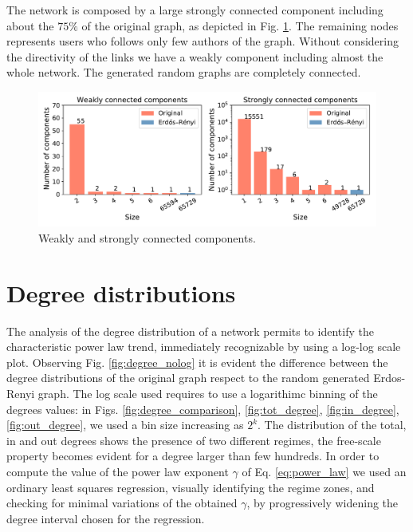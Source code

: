 \documentclass[11pt, twoside]{report}
\begin{document}
%  



The network is composed by a large strongly connected component including about the $75\%$ of the original graph, as depicted in Fig. \ref{fig:components}. The remaining nodes represents users who follows only few authors of the graph. Without considering the directivity of the links
we have a weakly component including almost the whole network. The generated random graphs are completely connected.


    \begin{figure}[H]
      \centering
      \includegraphics[width=\textwidth]{../../scripts/network_analysis/imgs/connectivity.pdf}
      \caption{Weakly and strongly connected components.}
      \label{fig:components}
    \end{figure}


    \section{Degree distributions}
    The analysis of the degree distribution of a network permits to identify the characteristic power law trend, immediately recognizable
    by using a log-log scale plot. Observing Fig. \ref{fig:degree_nolog} it is evident the difference between the degree distributions of the original graph respect to the random generated Erdos-Renyi graph.
    The log scale used requires to use a logarithimc binning of the degrees values: in Figs. \ref{fig:degree_comparison}, \ref{fig:tot_degree}, \ref{fig:in_degree}, \ref{fig:out_degree}, we used a bin size increasing as $2^k$.
    The distribution of the total, in and out degrees shows the presence of two different regimes, the free-scale property becomes evident
    for a degree larger than few hundreds. In order to compute the value of the power law exponent $\gamma$ of Eq. \ref{eq:power_law} we used an ordinary least squares regression, visually identifying the regime zones, and checking for minimal variations of the obtained $\gamma$, by progressively widening the degree interval chosen for the regression.
\end{document}
